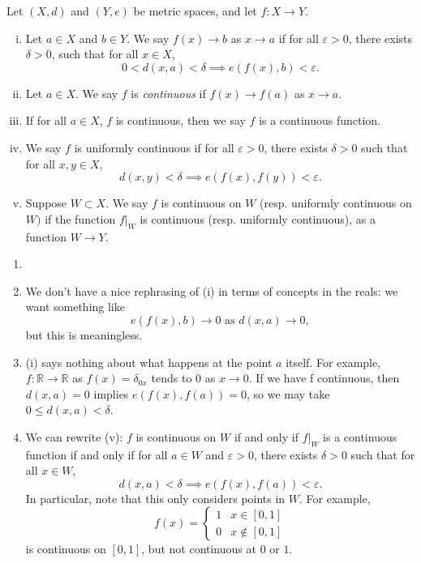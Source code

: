 \documentclass[12pt]{article}
\begin{document}
\begin{definition}
	Let $(X, d)$ and $(Y, e)$ be metric spaces, and let $f:X \to Y$.
	\begin{enumerate}[(i)]
		\item Let $a \in X$ and $b \in Y$. We say $f(x) \to b$ as $x \to a$ if for all $\varepsilon > 0$, there exists $\delta > 0$, such that for all $x \in X$,
			\[
				0 < d(x, a) < \delta \implies e(f(x), b) < \varepsilon
			.\]
		\item Let $a \in X$. We say $f$ is \textit{continuous} if $f(x) \to f(a)$ as $x \to a$.
		\item If for all $a \in X$, $f$ is continuous, then we say $f$ is a continuous function.
		\item We say $f$ is uniformly continuous if for all $\varepsilon > 0$, there exists $\delta > 0$ such that for all $x, y \in X$,
			\[
				d(x, y) < \delta \implies e(f(x), f(y)) < \varepsilon
			.\]
		\item Suppose $W \subset X$. We say $f$ is continuous on $W$ (resp. uniformly continuous on $W)$ if the function $f|_{W}$ is continuous (resp. uniformly continuous), as a function $W \to Y$.
	\end{enumerate}
	
\end{definition}

\begin{remark}
	\begin{enumerate}[1.]
		\item[]
		\item	We don't have a nice rephrasing of (i) in terms of concepts in the reals: we want something like
			\[
				e(f(x), b) \to 0 \text{ as } d(x, a) \to 0
			,\]
			but this is meaningless.
		\item (i) says nothing about what happens at the point $a$ itself. For example, $f : \mathbb{R} \to \mathbb{R}$ as $f(x) = \delta_{0x}$ tends to $0$ as $x \to 0$. If we have f continuous, then $d(x, a) = 0$ implies $e(f(x), f(a)) = 0$, so we may take $0 \leq d(x, a) < \delta$.
		\item We can rewrite (v): $f$ is continuous on $W$ if and only if $f|_{W}$ is a continuous function if and only if for all $a \in W$ and $\varepsilon > 0$, there exists $\delta > 0$ such that for all $x \in W$,
			 \[
				 d(x, a) < \delta \implies e(f(x), f(a)) < \varepsilon
			.\]
			In particular, note that this only considers points in $W$. For example,
			\[
				f(x) =
				\begin{cases}
					1 & x \in [0, 1] \\
					0 & x \not \in [0, 1]
				\end{cases}
			\]
			is continuous on $[0, 1]$, but not continuous at $0$ or $1$.
	\end{enumerate}
\end{remark}
\end{document}
